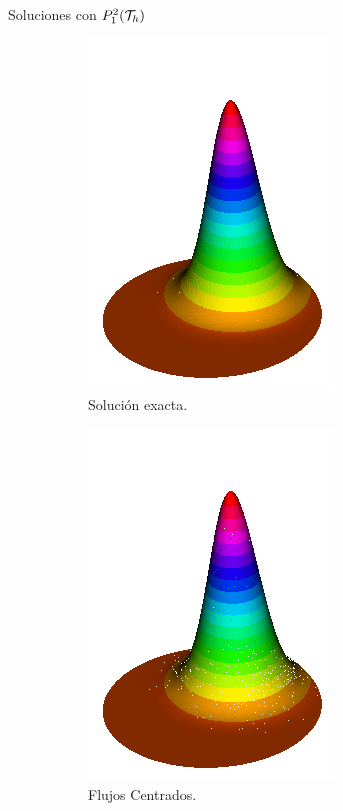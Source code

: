 \begin{frame}{Soluciones con $\relax{P}_1^2(\mathcal{T}_h)$}
\begin{figure}[h!]
\begin{subfigure}[b]{0.27\textwidth}
				\includegraphics[scale=0.22]{img/Conveccion_Reaccion/Recortes/steady_convect_react_exact_n_256.png}
				\caption{Solución exacta.}
			\end{subfigure}
			\begin{subfigure}[b]{0.27\textwidth}
				\centering
				\includegraphics[scale=0.22]{img/Conveccion_Reaccion/Recortes/steady_convect_react_approx_CF_n_256.png}
				\caption{Flujos Centrados.}
			\end{subfigure}
			\begin{subfigure}[b]{0.27\textwidth}
				\centering

\end{subfigure}
\end{figure}
\end{frame}
